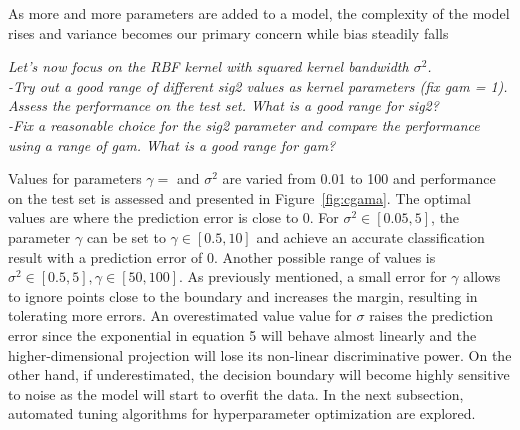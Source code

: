 \documentclass{article}
\begin{document}
As more and more parameters are added to a model, the complexity of the model rises and variance becomes our primary concern while bias steadily falls


\textit{Let’s now focus on the RBF kernel with squared kernel bandwidth $\sigma^2$. \\
-Try out a good range of different sig2 values as kernel parameters (fix gam = 1).
Assess the performance on the test set. What is a good range for sig2?\\
-Fix a reasonable choice for the sig2 parameter and compare the performance
using a range of gam. What is a good range for gam?}


Values for parameters $\gamma=$ and $\sigma^2$ are varied from 0.01 to 100 and performance on the test set is assessed and presented in Figure~\ref{fig:cgama}. The optimal values are where the prediction error is close to 0. For $\sigma^2 \in [0.05,5] $, the parameter $\gamma$ can be set to $\gamma \in [0.5,10] $ and achieve an accurate classification result with a prediction error of 0. Another possible range of values is 
$\sigma^2 \in [0.5,5], \gamma \in [50,100]$. As previously mentioned, a small error for $\gamma$ allows to ignore points close to the boundary and increases the margin, resulting in tolerating more errors.
An overestimated value value for $\sigma$ raises the prediction error 
since the exponential in equation 5 will behave almost linearly and the higher-dimensional projection will lose its non-linear discriminative power. On the other hand, if underestimated, the decision boundary will become highly sensitive to noise as the model will start to overfit the data. In the next subsection, 
automated tuning algorithms for hyperparameter optimization are explored.
\end{document}
